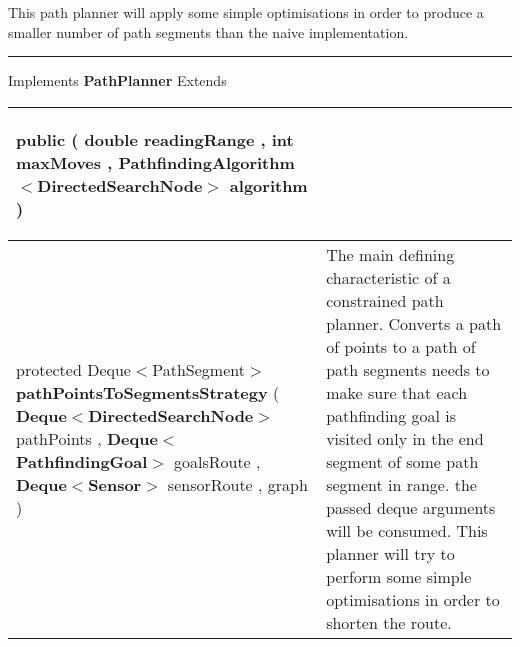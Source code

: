  {\scriptsize This path planner will apply some simple optimisations in order to produce a smaller number of path segments than the naive implementation.
 
\vspace*{4pt} \hrule \vspace*{3pt}
Implements \textbf{ PathPlanner }
Extends \textbf{ \hyperref[tab:BasePathPlanner]{\color{blue}{BasePathPlanner}} }
\vspace*{-5pt} 
\begin{tabularx}{\linewidth}{X|m{}}
\label{tab:SimplePathPlanner}
\begin{raggedleft}public  \textbf{\hyperref[tab:SimplePathPlanner]{\color{blue}{SimplePathPlanner}} }(\newline \hfill 
\hspace*{ 5pt} \textbf{double} readingRange , \newline
 \hspace*{ 5pt} \textbf{int} maxMoves , \newline
 \hspace*{ 5pt} \textbf{PathfindingAlgorithm$<$DirectedSearchNode$>$} algorithm  )
\end{raggedleft} &
 \\ \hline 
\begin{raggedleft}protected Deque$<$PathSegment$>$ \textbf{pathPointsToSegmentsStrategy }(\newline \hfill 
\hspace*{ 5pt} \textbf{Deque$<$DirectedSearchNode$>$} pathPoints , \newline
 \hspace*{ 5pt} \textbf{Deque$<$PathfindingGoal$>$} goalsRoute , \newline
 \hspace*{ 5pt} \textbf{Deque$<$Sensor$>$} sensorRoute , \newline
 \hspace*{ 5pt} \textbf{\hyperref[tab:ConstrainedTreeGraph]{\color{blue}{ConstrainedTreeGraph}}} graph  )
\end{raggedleft} &
 The main defining characteristic of a constrained path planner. Converts a path of points to a path of path segments\newline%
 needs to make sure that each pathfinding goal is visited only in the end segment of some path segment in range.\newline%
 the passed deque arguments will be consumed. This planner will try to perform some simple optimisations in order to shorten the route.\newline%

\end{tabularx}}
